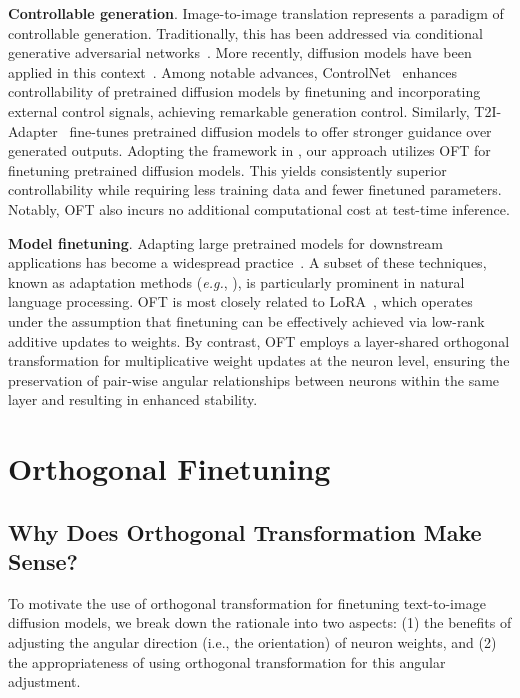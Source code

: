 \textbf{Controllable generation}. Image-to-image translation represents a paradigm of controllable generation. Traditionally, this has been addressed via conditional generative adversarial networks~\cite{isola2017image,zhu2017toward,wang2018high,park2019semantic,choi2018stargan}. More recently, diffusion models have been applied in this context~\cite{saharia2022palette,voynov2022sketch,wang2022pretraining}. Among notable advances, ControlNet~\cite{zhang2023adding} enhances controllability of pretrained diffusion models by finetuning and incorporating external control signals, achieving remarkable generation control. Similarly, T2I-Adapter~\cite{mou2023t2i} fine-tunes pretrained diffusion models to offer stronger guidance over generated outputs. Adopting the framework in \cite{zhang2023adding,mou2023t2i}, our approach utilizes OFT for finetuning pretrained diffusion models. This yields consistently superior controllability while requiring less training data and fewer finetuned parameters. Notably, OFT also incurs no additional computational cost at test-time inference.

\textbf{Model finetuning}. Adapting large pretrained models for downstream applications has become a widespread practice~\cite{devlin2018bert,brown2020language,he2022masked}. A subset of these techniques, known as adaptation methods (\emph{e.g.}, \cite{hulora2022,houlsby2019parameter,pfeiffer2020adapterfusion}), is particularly prominent in natural language processing. OFT is most closely related to LoRA~\cite{hulora2022}, which operates under the assumption that finetuning can be effectively achieved via low-rank additive updates to weights. By contrast, OFT employs a layer-shared orthogonal transformation for multiplicative weight updates at the neuron level, ensuring the preservation of pair-wise angular relationships between neurons within the same layer and resulting in enhanced stability.

\section{Orthogonal Finetuning}

\subsection{Why Does Orthogonal Transformation Make Sense?}

To motivate the use of orthogonal transformation for finetuning text-to-image diffusion models, we break down the rationale into two aspects: (1) the benefits of adjusting the angular direction (i.e., the orientation) of neuron weights, and (2) the appropriateness of using orthogonal transformation for this angular adjustment.

